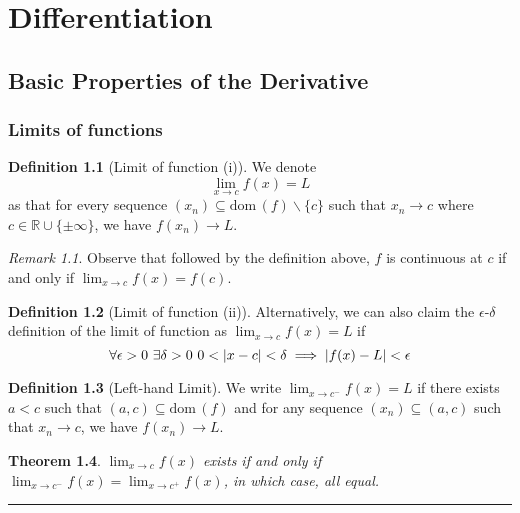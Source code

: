 \documentclass[12pt, lettersize]{book}
\theoremstyle{plain}
\newtheorem{thm}{Theorem}[section]
\theoremstyle{definition}
\newtheorem{dfn}[thm]{Definition}
\theoremstyle{remark}
\newtheorem*{rem}{Remark}
\newcommand{\R}{\mathbb{R}}
\newcommand{\dom}{\text{dom}\,}
\newcommand{\lline}{\noindent\rule{\textwidth}{1pt}}
\begin{document}
	\chapter{Differentiation}
		\newpage
		\section{Basic Properties of the Derivative}
			\subsection*{Limits of functions}
			\begin{dfn}[Limit of function (i)]
				We denote 
				\begin{displaymath}
					\lim_{x\rightarrow c}f(x)=L
				\end{displaymath}
				as that for every sequence $(x_n)\subseteq\dom(f)\backslash\{c\}$ such that $x_n\rightarrow c$ where $c\in\R\cup\{\pm\infty\}$, we have $f(x_n)\rightarrow L$.
			\end{dfn}
			\begin{rem}
				Observe that followed by the definition above, $f$ is continuous at $c$ if and only if $\lim_{x\rightarrow c}f(x)=f(c)$.
			\end{rem}
			
			\begin{dfn}[Limit of function (ii)]
			Alternatively, we can also claim the $\epsilon$-$\delta$ definition of the limit of function as $\lim_{x\rightarrow c}f(x)=L$ if
			\begin{displaymath}
				\forall\epsilon>0\ \exists\delta>0\ 0<\abs{x-c}<\delta\implies\abs{f(x)-L}<\epsilon
			\end{displaymath}	
			\end{dfn}
			
			\begin{dfn}[Left-hand Limit]
			We write $\lim_{x\rightarrow c^-}f(x)=L$ if there exists $a<c$ such that $(a,c)\subseteq\dom(f)$ and for any sequence $(x_n)\subseteq(a,c)$ such that $x_n\rightarrow c$, we have $f(x_n)\rightarrow L$.
			\end{dfn}
			
			\begin{thm}
				$\lim_{x\rightarrow c}f(x)$ exists if and only if $\lim_{x\rightarrow c^-}f(x)=\lim_{x\rightarrow c^+}f(x)$, in which case, all equal.
			\end{thm}
			\newpage
			\lline
			
\end{document}

